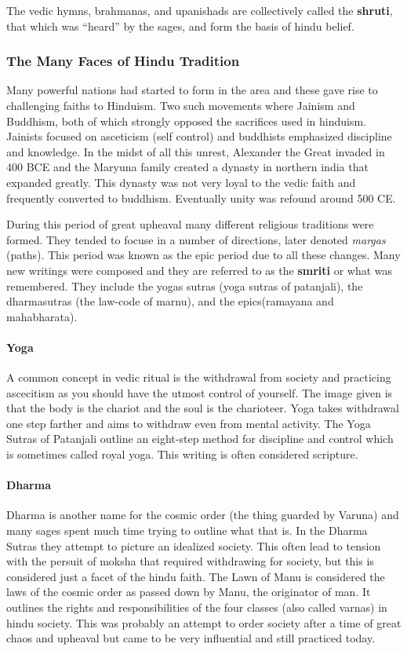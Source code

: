 \documentclass{article}
\begin{document}
The vedic hymns, brahmanas, and upanishads are collectively called the \textbf{shruti}, that which was ``heard'' by the sages, and form the basis of hindu belief.

\subsubsection*{The Many Faces of Hindu Tradition}
\label{ssub:the_many_faces_of_hindu_tradition}
Many powerful nations had started to form in the area and these gave rise to challenging faiths to Hinduism. Two such movements where Jainism and Buddhism, both of which strongly opposed the sacrifices used in hinduism. Jainists focused on asceticism (self control) and buddhists emphasized discipline and knowledge. In the midst of all this unrest, Alexander the Great invaded in 400 BCE and the Maryuna family created a dynasty in northern india that expanded greatly. This dynasty was not very loyal to the vedic faith and frequently converted to buddhism. Eventually unity was refound around 500 CE.

During this period of great upheaval many different religious traditions were formed. They tended to focuse in a number of directions, later denoted \emph{margas} (paths). This period was known as the epic period due to all these changes. Many new writings were composed and they are referred to as the \textbf{smriti} or what was remembered. They include the yogas sutras (yoga sutras of patanjali), the dharmasutras (the law-code of marnu), and the epics(ramayana and mahabharata).

\paragraph{Yoga}
\label{par:yoga}
A common concept in vedic ritual is the withdrawal from society and practicing ascecitism as you should have the utmost control of yourself. The image given is that the body is the chariot and the soul is the charioteer. Yoga takes withdrawal one step farther and aims to withdraw even from mental activity. The Yoga Sutras of Patanjali outline an eight-step method for discipline and control which is sometimes called royal yoga. This writing is often considered scripture.

\paragraph{Dharma}
\label{par:dharma}
Dharma is another name for the cosmic order (the thing guarded by Varuna) and many sages spent much time trying to outline what that is. In the Dharma Sutras they attempt to picture an idealized society. This often lead to tension with the persuit of moksha that required withdrawing for society, but this is considered just a facet of the hindu faith. The Lawn of Manu is considered the laws of the cosmic order as passed down by Manu, the originator of man. It outlines the rights and responsibilities of the four classes (also called varnas) in hindu society. This was probably an attempt to order society after a time of great chaos and upheaval but came to be very influential and still practiced today.
\end{document}
